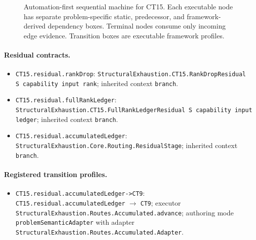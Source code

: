\begin{landscape}
\begin{figure}[p]
\begin{adjustbox}{max totalsize={\linewidth}{0.72\textheight},center}
\begin{tikzpicture}[x=1cm,y=1cm]
\end{tikzpicture}%
\end{adjustbox}
\caption{Automation-first sequential machine for CT15. Each executable node has separate problem-specific static, predecessor, and framework-derived dependency boxes. Terminal nodes consume only incoming edge evidence. Transition boxes are executable framework profiles.}
\label{fig:ct15-machine}
\end{figure}
\end{landscape}

\begingroup\small\sloppy
\paragraph{Residual contracts.}
\begin{itemize}
\item \texttt{CT15.\allowbreak{}residual.\allowbreak{}rank\allowbreak{}Drop}: \texttt{Structural\allowbreak{}Exhaustion.\allowbreak{}CT15.\allowbreak{}Rank\allowbreak{}Drop\allowbreak{}Residual S capability input rank}; inherited context \texttt{branch}.
\item \texttt{CT15.\allowbreak{}residual.\allowbreak{}full\allowbreak{}Rank\allowbreak{}Ledger}: \texttt{Structural\allowbreak{}Exhaustion.\allowbreak{}CT15.\allowbreak{}Full\allowbreak{}Rank\allowbreak{}Ledger\allowbreak{}Residual S capability input ledger}; inherited context \texttt{branch}.
\item \texttt{CT15.\allowbreak{}residual.\allowbreak{}accumulated\allowbreak{}Ledger}: \texttt{Structural\allowbreak{}Exhaustion.\allowbreak{}Core.\allowbreak{}Routing.\allowbreak{}Residual\allowbreak{}Stage}; inherited context \texttt{branch}.
\end{itemize}
\paragraph{Registered transition profiles.}
\begin{itemize}
\item \texttt{CT15.\allowbreak{}residual.\allowbreak{}accumulated\allowbreak{}Ledger-\allowbreak{}>CT9}: \texttt{CT15.\allowbreak{}residual.\allowbreak{}accumulated\allowbreak{}Ledger} $\to$ \texttt{CT9}; executor \texttt{Structural\allowbreak{}Exhaustion.\allowbreak{}Routes.\allowbreak{}Accumulated.\allowbreak{}advance}; authoring mode \texttt{problem\allowbreak{}Semantic\allowbreak{}Adapter} with adapter \texttt{Structural\allowbreak{}Exhaustion.\allowbreak{}Routes.\allowbreak{}Accumulated.\allowbreak{}Adapter}.
\end{itemize}
\endgroup
